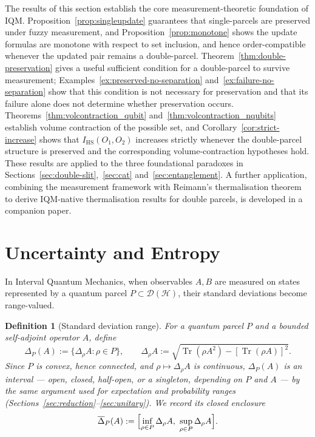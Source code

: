 \documentclass[11pt, onecolumn]{article}
\newtheorem{definition}{Definition}
\begin{document}
The results of this section establish the core measurement-theoretic
foundation of IQM. Proposition~\ref{prop:singleupdate} guarantees that single-parcels are
preserved under fuzzy measurement, and Proposition~\ref{prop:monotone} shows the update formulas are monotone with respect to set inclusion, and hence order-compatible whenever the updated pair remains a double-parcel. Theorem~\ref{thm:double-preservation} gives a useful sufficient condition for a double-parcel to survive
measurement; Examples~\ref{ex:preserved-no-separation} and~\ref{ex:failure-no-separation} show that this condition is not necessary for preservation and that its failure alone does not determine whether preservation occurs. Theorems~\ref{thm:volcontraction_qubit} and~\ref{thm:volcontraction_nqubits} establish volume contraction of the
possible set, and Corollary~\ref{cor:strict-increase} shows that $I_{\mathrm{HS}}(O_1, O_2)$ increases
strictly whenever the double-parcel structure is preserved and the corresponding volume-contraction hypotheses hold. These results are applied
to the three foundational paradoxes in Sections~\ref{sec:double-slit},~\ref{sec:cat} and~\ref{sec:entanglement}. A further
application, combining the measurement framework with Reimann's
thermalisation theorem to derive IQM-native thermalisation results
for double parcels, is developed in a companion paper.

\section{Uncertainty and Entropy}\label{sec:uncertainty}


In Interval Quantum Mechanics, when observables $A,B$ are measured on states represented by a quantum parcel $P\subset\mathcal D(\mathcal H)$, their standard deviations become range-valued.

\begin{definition}[Standard deviation range]
\label{def:stddev}
For a quantum parcel $P$ and a bounded self-adjoint operator $A$, define
\[
\Delta_P(A) := \{\Delta_\rho A : \rho\in P\},
\qquad
\Delta_\rho A := \sqrt{\operatorname{Tr}(\rho A^2)-[\operatorname{Tr}(\rho A)]^2}.
\]
Since $P$ is convex, hence connected, and $\rho\mapsto\Delta_\rho A$ is continuous, $\Delta_P(A)$ is an interval — open, closed, half-open, or a singleton, depending on $P$ and $A$ — by the same argument used for expectation and probability ranges (Sections~\ref{sec:reduction}--\ref{sec:unitary}). We record its closed enclosure
\[
\overline\Delta_P(A) := \Bigl[\inf_{\rho\in P}\Delta_\rho A,\ \sup_{\rho\in P}\Delta_\rho A\Bigr].
\]
\end{definition}
\end{document}
